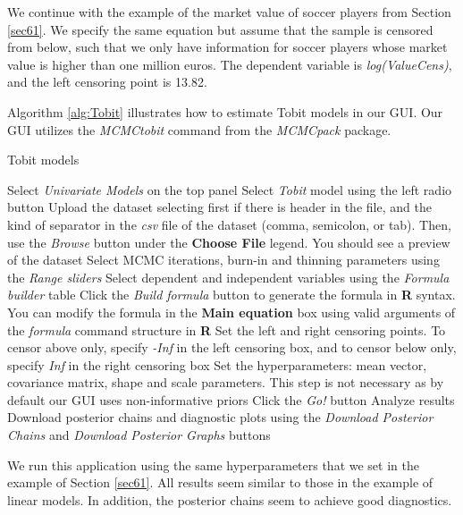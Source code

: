 We continue with the example of the market value of soccer players from Section \ref{sec61}. We specify the same equation but assume that the sample is censored from below, such that we only have information for soccer players whose market value is higher than one million euros. The dependent variable is \textit{log(ValueCens)}, and the left censoring point is 13.82.

Algorithm \ref{alg:Tobit} illustrates how to estimate Tobit models in our GUI. Our GUI utilizes the \textit{MCMCtobit} command from the \textit{MCMCpack} package.

\clearpage 
\begin{algorithm}[h!]
	\caption{Tobit models}\label{alg:Tobit}
	\begin{algorithmic}[1]  		 			
		\State Select \textit{Univariate Models} on the top panel
		\State Select \textit{Tobit} model using the left radio button
		\State Upload the dataset selecting first if there is header in the file, and the kind of separator in the \textit{csv} file of the dataset (comma, semicolon, or tab). Then, use the \textit{Browse} button under the \textbf{Choose File} legend. You should see a preview of the dataset
		\State Select MCMC iterations, burn-in and thinning parameters using the \textit{Range sliders}
		\State Select dependent and independent variables using the \textit{Formula builder} table
		\State Click the \textit{Build formula} button to generate the formula in \textbf{R} syntax. You can modify the formula in the \textbf{Main equation} box using valid arguments of the \textit{formula} command structure in \textbf{R}
		\State Set the left and right censoring points. To censor above only, specify \textit{-Inf} in the left censoring box, and to censor below only, specify \textit{Inf} in the right censoring box
		\State Set the hyperparameters: mean vector, covariance matrix, shape and scale parameters. This step is not necessary as by default our GUI uses non-informative priors
		\State Click the \textit{Go!} button
		\State Analyze results
		\State Download posterior chains and diagnostic plots using the \textit{Download Posterior Chains} and \textit{Download Posterior Graphs} buttons
	\end{algorithmic} 
\end{algorithm}

We run this application using the same hyperparameters that we set in the example of Section \ref{sec61}. All results seem similar to those in the example of linear models. In addition, the posterior chains seem to achieve good diagnostics.


